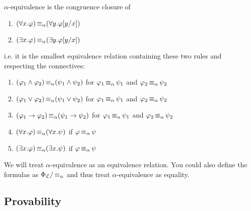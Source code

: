 \begin{boxdef}
\begin{defi}
    \alert{$\alpha$-equivalence} is the \alert{congruence closure} of 
    \begin{enumerate}
        \item $(\forall x. \varphi) \operatorname{\equiv_{\alpha}} (\forall y. \varphi[y/x])$
        \item $(\exists x. \varphi) \operatorname{\equiv_{\alpha}} (\exists y. \varphi[y/x])$
    \end{enumerate}
    i.e. it is the smallest equivalence relation containing these two rules and respecting the connectives: 
    \begin{enumerate}
        \item $(\varphi_1 \wedge \varphi_2) \operatorname{\equiv_{\alpha}} (\psi_1 \wedge \psi_2)$ for $\varphi_1 \operatorname{\equiv_{\alpha}} \psi_1$ and $\varphi_2 \operatorname{\equiv_{\alpha}} \psi_2$
        \item $(\varphi_1 \lor \varphi_2) \operatorname{\equiv_{\alpha}} (\psi_1 \lor \psi_2)$ for $\varphi_1 \operatorname{\equiv_{\alpha}} \psi_1$ and $\varphi_2 \operatorname{\equiv_{\alpha}} \psi_2$
        \item $(\varphi_1 \to \varphi_2) \operatorname{\equiv_{\alpha}} (\psi_1 \to \psi_2)$ for $\varphi_1 \operatorname{\equiv_{\alpha}} \psi_1$ and $\varphi_2 \operatorname{\equiv_{\alpha}} \psi_2$
        \item $(\forall x. \varphi) \operatorname{\equiv_{\alpha}} (\forall x. \psi)$ if $\varphi \operatorname{\equiv_{\alpha}} \psi$
        \item $(\exists x. \varphi) \operatorname{\equiv_{\alpha}} (\exists x. \psi)$ if $\varphi \operatorname{\equiv_{\alpha}} \psi$
    \end{enumerate}
\end{defi}
\end{boxdef}

\begin{rem}
    We will treat $\alpha$-equivalence as an equivalence relation. 
    You could also define the formulas as $\Phi_{\mathcal{L}} / \operatorname{\equiv_{\alpha}}$ and thus treat $\alpha$-equivalence as equality.
\end{rem}

\subsection{Provability}


